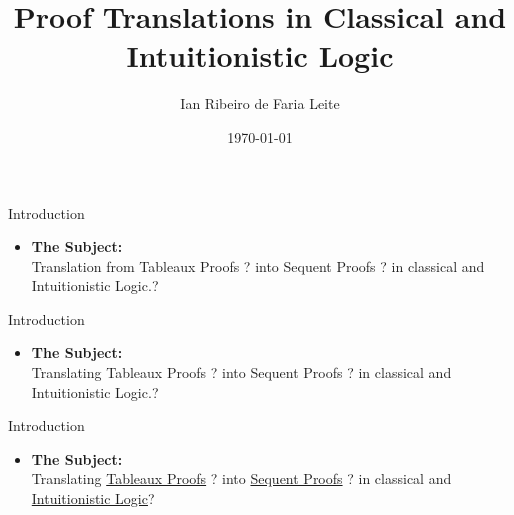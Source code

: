\documentclass{beamer}
\title{Proof Translations in Classical and Intuitionistic Logic}
\author{Ian Ribeiro de Faria Leite}
\date{\today}
\begin{document}
\begin{frame}
    \titlepage
\end{frame}



%



\begin{frame}{Introduction}
    \begin{itemize}
        \item \textbf{The Subject:}  \\
        {\color{white} Translation from Tableaux Proofs {\color{white}?} into Sequent Proofs {\color{white}?} in classical and Intuitionistic Logic.{\color{white}?}}
    \end{itemize}
\end{frame}

\begin{frame}{Introduction}
    \begin{itemize}
        \item \textbf{The Subject:}  \\
        { Translating Tableaux Proofs {\color{white}?} into Sequent Proofs {\color{white}?} in classical and Intuitionistic Logic.{\color{white}?}}
    \end{itemize}
\end{frame}

\begin{frame}{Introduction}
    \begin{itemize}
        \item \textbf{The Subject:}  \\
        { Translating \underline{Tableaux Proofs} {\color{blue}?} into \underline{Sequent Proofs} {\color{blue}?} in classical and \underline{Intuitionistic Logic}{\color{blue}?}}
    \end{itemize}
\end{frame}
\end{document}
